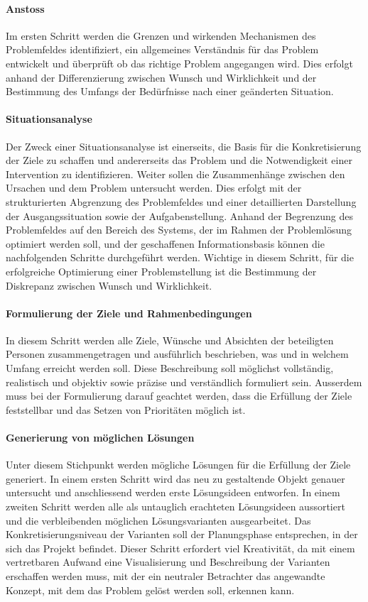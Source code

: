 \paragraph{Anstoss} Im ersten Schritt werden die Grenzen und wirkenden Mechanismen des Problemfeldes identifiziert, ein allgemeines Verständnis für das Problem entwickelt und überprüft ob das richtige Problem angegangen wird. Dies erfolgt anhand der Differenzierung zwischen Wunsch und Wirklichkeit und der Bestimmung des Umfangs der Bedürfnisse nach einer geänderten Situation.

\paragraph{Situationsanalyse} Der Zweck einer Situationsanalyse ist einerseits, die Basis für die Konkretisierung der Ziele zu schaffen und andererseits das Problem und die Notwendigkeit einer Intervention zu identifizieren. Weiter sollen die Zusammenhänge zwischen den Ursachen und dem Problem untersucht werden. Dies erfolgt mit der strukturierten Abgrenzung des Problemfeldes und einer detaillierten Darstellung der Ausgangssituation sowie der Aufgabenstellung. Anhand der Begrenzung des Problemfeldes auf den Bereich des Systems, der im Rahmen der Problemlösung optimiert werden soll, und der geschaffenen Informationsbasis können die nachfolgenden Schritte durchgeführt werden. Wichtige in diesem Schritt, für die erfolgreiche Optimierung einer Problemstellung ist die Bestimmung der Diskrepanz zwischen Wunsch und Wirklichkeit.

\paragraph{Formulierung der Ziele und Rahmenbedingungen} In diesem Schritt werden alle Ziele, Wünsche und Absichten der beteiligten Personen zusammengetragen und ausführlich beschrieben, was und in welchem Umfang erreicht werden soll. Diese Beschreibung soll möglichst vollständig, realistisch und objektiv sowie präzise und verständlich formuliert sein. Ausserdem muss bei der Formulierung darauf geachtet werden, dass die Erfüllung der Ziele feststellbar und das Setzen von Prioritäten möglich ist. 

\paragraph{Generierung von möglichen Lösungen} Unter diesem Stichpunkt werden mögliche Lösungen für die Erfüllung der Ziele generiert. In einem ersten Schritt wird das neu zu gestaltende Objekt genauer untersucht und anschliessend werden erste Lösungsideen entworfen. In einem zweiten Schritt werden alle als untauglich erachteten Lösungsideen aussortiert und die verbleibenden möglichen Lösungsvarianten ausgearbeitet. 
Das Konkretisierungsniveau der Varianten soll der Planungsphase entsprechen, in der sich das Projekt befindet. Dieser Schritt erfordert viel Kreativität, da mit einem vertretbaren Aufwand eine Visualisierung und Beschreibung der Varianten erschaffen werden muss, mit der ein neutraler Betrachter das angewandte Konzept, mit dem das Problem gelöst werden soll, erkennen kann.

